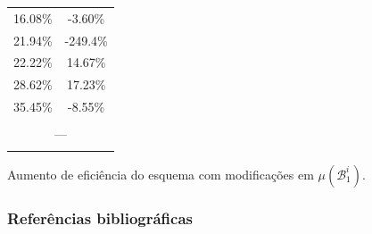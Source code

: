\documentclass[12pt]{beamer}
\begin{document}
\begin{frame}
\begin{table}
\begin{tabular}{c|c}
      16.08\%       & -3.60\%       \\
      21.94\%       & -249.4\%     \\
      \midrule
      22.22\%       & 14.67\%       \\
      28.62\%       & 17.23\%       \\
      35.45\%       & -8.55\%       \\
      \midrule
      \multicolumn{2}{c}{}          \\
      \multicolumn{2}{c}{---}       \\
      \multicolumn{2}{c}{}          \\
      \bottomrule
    \end{tabular}
  \end{table}
  \begin{center}
    Aumento de eficiência do esquema com modificações
      em $\mu(\mathcal{B}_{1}^{i})$.
  \end{center}
\end{frame}

\begin{frame}
  \frametitle{Referências bibliográficas}
  
  
\end{frame}
\end{document}
